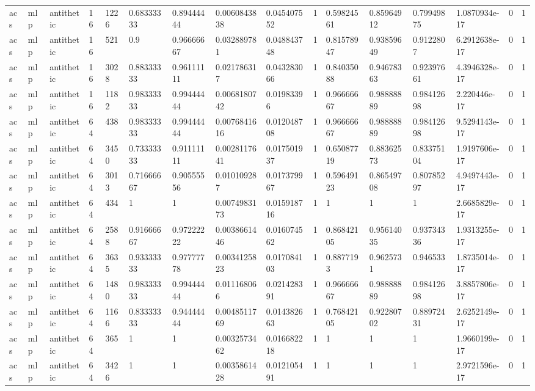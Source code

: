 \begin{tabular}{llllllllllllllll}
acs & mlp & antithetic & 16 & 1226 & 0.68333333 & 0.89444444 & 0.0060843838 & 0.045407552 & 1 & 0.59824561 & 0.85964912 & 0.79949875 & 1.0870934e-17 & 0 & 1 \\
acs & mlp & antithetic & 16 & 521 & 0.9 & 0.96666667 & 0.032889781 & 0.048843748 & 1 & 0.81578947 & 0.93859649 & 0.9122807 & 6.2912638e-17 & 0 & 1 \\
acs & mlp & antithetic & 16 & 3028 & 0.88333333 & 0.96111111 & 0.021786317 & 0.043283066 & 1 & 0.84035088 & 0.94678363 & 0.92397661 & 4.3946328e-17 & 0 & 1 \\
acs & mlp & antithetic & 16 & 1182 & 0.98333333 & 0.99444444 & 0.0068180742 & 0.01983396 & 1 & 0.96666667 & 0.98888889 & 0.98412698 & 2.220446e-17 & 0 & 1 \\
acs & mlp & antithetic & 64 & 438 & 0.98333333 & 0.99444444 & 0.0076841616 & 0.012048708 & 1 & 0.96666667 & 0.98888889 & 0.98412698 & 9.5294143e-17 & 0 & 1 \\
acs & mlp & antithetic & 64 & 3450 & 0.73333333 & 0.91111111 & 0.0028117641 & 0.017501937 & 1 & 0.65087719 & 0.88362573 & 0.83375104 & 1.9197606e-17 & 0 & 1 \\
acs & mlp & antithetic & 64 & 3013 & 0.71666667 & 0.90555556 & 0.010109287 & 0.017379967 & 1 & 0.59649123 & 0.86549708 & 0.80785297 & 4.9497443e-17 & 0 & 1 \\
acs & mlp & antithetic & 64 & 434 & 1 & 1 & 0.0074983173 & 0.015918716 & 1 & 1 & 1 & 1 & 2.6685829e-17 & 0 & 1 \\
acs & mlp & antithetic & 64 & 2588 & 0.91666667 & 0.97222222 & 0.0038661446 & 0.016074562 & 1 & 0.86842105 & 0.95614035 & 0.93734336 & 1.9313255e-17 & 0 & 1 \\
acs & mlp & antithetic & 64 & 3635 & 0.93333333 & 0.97777778 & 0.0034125823 & 0.017084103 & 1 & 0.8877193 & 0.9625731 & 0.946533 & 1.8735014e-17 & 0 & 1 \\
acs & mlp & antithetic & 64 & 1480 & 0.98333333 & 0.99444444 & 0.011168066 & 0.021428391 & 1 & 0.96666667 & 0.98888889 & 0.98412698 & 3.8857806e-17 & 0 & 1 \\
acs & mlp & antithetic & 64 & 1166 & 0.83333333 & 0.94444444 & 0.0048511769 & 0.014382663 & 1 & 0.76842105 & 0.92280702 & 0.88972431 & 2.6252149e-17 & 0 & 1 \\
acs & mlp & antithetic & 64 & 365 & 1 & 1 & 0.0032573462 & 0.016682218 & 1 & 1 & 1 & 1 & 1.9660199e-17 & 0 & 1 \\
acs & mlp & antithetic & 64 & 3426 & 1 & 1 & 0.0035861428 & 0.012105491 & 1 & 1 & 1 & 1 & 2.9721596e-17 & 0 & 1 \\

\end{tabular}
